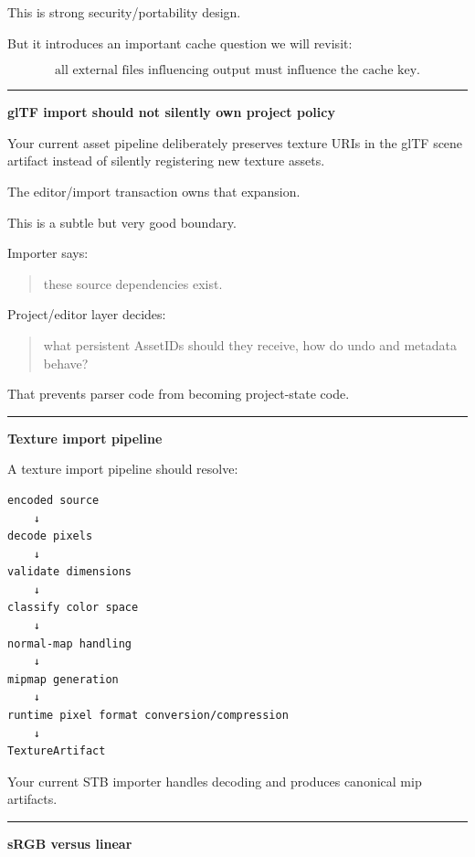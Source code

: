 This is strong security/portability design.

But it introduces an important cache question we will revisit:

\[
\boxed{
\text{all external files influencing output must influence the cache key}.
}
\]

\begin{center}\rule{0.5\linewidth}{0.5pt}\end{center}

\textbf{glTF import should not silently own project policy}

Your current asset pipeline deliberately preserves texture URIs in the glTF scene artifact instead of silently registering new texture assets.

The editor/import transaction owns that expansion.

This is a subtle but very good boundary.

Importer says:

\begin{quote}
these source dependencies exist.
\end{quote}

Project/editor layer decides:

\begin{quote}
what persistent AssetIDs should they receive, how do undo and metadata behave?
\end{quote}

That prevents parser code from becoming project-state code.

\begin{center}\rule{0.5\linewidth}{0.5pt}\end{center}

\textbf{Texture import pipeline}

A texture import pipeline should resolve:

\begin{verbatim}
encoded source
    ↓
decode pixels
    ↓
validate dimensions
    ↓
classify color space
    ↓
normal-map handling
    ↓
mipmap generation
    ↓
runtime pixel format conversion/compression
    ↓
TextureArtifact
\end{verbatim}

Your current STB importer handles decoding and produces canonical mip artifacts.

\begin{center}\rule{0.5\linewidth}{0.5pt}\end{center}

\textbf{sRGB versus linear}

